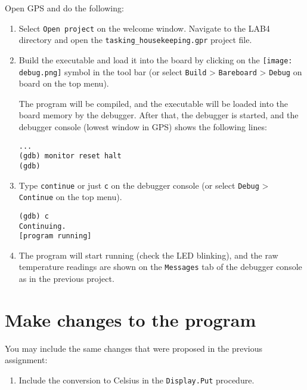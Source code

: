 Open GPS and do the following:
\begin{enumerate}
\item Select {\tt Open project} on the welcome window. Navigate to the LAB4 directory and open the {\tt tasking\_housekeeping.gpr} project file.

\item Build the executable and load it into the board by clicking on the \hbox{\texttt{[image: debug.png]}} symbol in the tool bar (or select {\tt Build} > {\tt Bareboard} > {\tt Debug} on board on the top menu).

The program will be compiled, and the executable will be loaded into the board memory by the debugger. After that, the debugger is started, and the debugger console (lowest window in GPS) shows the following lines:
\begin{verbatim}
...
(gdb) monitor reset halt
(gdb)
\end{verbatim}

\item Type {\tt continue} or just {\tt c} on the debugger console (or select {\tt Debug} > {\tt Continue} on the top menu).
\begin{verbatim}
(gdb) c
Continuing.
[program running]
\end{verbatim}

\item The program will start running (check the LED blinking), and the raw temperature readings are shown on the {\tt Messages} tab of the debugger console as in the previous project.
\end{enumerate}

\section{Make changes to the program}

You may include the same changes that were proposed in the previous assignment:

\begin{enumerate}
\item Include the conversion to Celsius in the {\tt Display.Put} procedure.
\end{enumerate}

